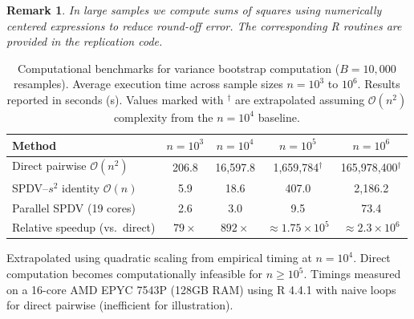 \documentclass[12pt,a4paper]{article}
\newtheorem{remark}{Remark}
\begin{document}
\begin{remark}
In large samples we compute sums of squares using numerically centered
expressions to reduce round-off error. The corresponding R routines are
provided in the replication code.
\end{remark}

\begin{table}[!h]
\centering
\caption{\label{tab:compute}
Computational benchmarks for variance bootstrap computation ($B = 10{,}000$ resamples). Average execution time across sample sizes $n = 10^3$ to $10^6$. Results reported in seconds (s). Values marked with $^\dagger$ are extrapolated assuming $\mathcal{O}(n^2)$ complexity from the $n=10^4$ baseline.}
\begin{threeparttable}
\begin{tabular}{lcccc}
\toprule
Method & $n=10^3$ & $n=10^4$ & $n=10^5$ & $n=10^6$ \\
\midrule
Direct pairwise $\mathcal{O}(n^2)$ & 206.8 & 16{,}597.8 & 1{,}659{,}784$^\dagger$ & 165{,}978{,}400$^\dagger$ \\[0.2em]
SPDV--$s^2$ identity $\mathcal{O}(n)$ & 5.9 & 18.6 & 407.0 & 2{,}186.2 \\[0.2em]
Parallel SPDV (19 cores) & 2.6 & 3.0 & 9.5 & 73.4 \\[0.2em]
Relative speedup (vs.\ direct) & $79\times$ & $892\times$ & $\approx 1.75 \times 10^5$ & $\approx 2.3 \times 10^6$ \\
\bottomrule
\end{tabular}
\begin{tablenotes}
\item[$^\dagger$] Extrapolated using quadratic scaling from empirical timing at $n=10^4$. Direct computation becomes computationally infeasible for $n \ge 10^5$. Timings measured on a 16-core AMD EPYC 7543P (128GB RAM) using R 4.4.1 with naive loops for direct pairwise (inefficient for illustration).
\end{tablenotes}
\end{threeparttable}
\end{table}
\end{document}
